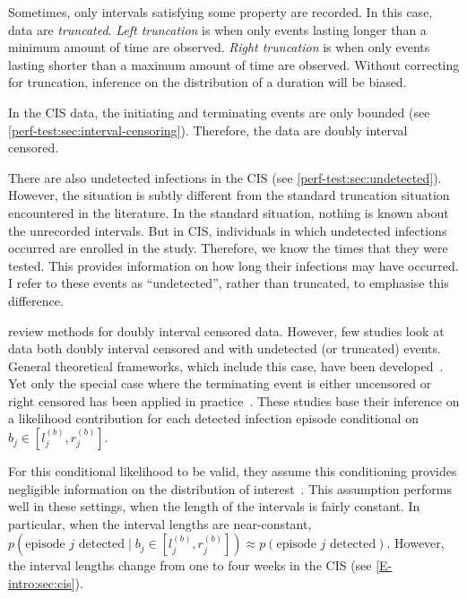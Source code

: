 \documentclass[thesis.tex]{subfiles}
\begin{document}
Sometimes, only intervals satisfying some property are recorded.
In this case, data are \emph{truncated}.
\emph{Left truncation} is when only events lasting longer than a minimum amount of time are observed.
\emph{Right truncation} is when only events lasting shorter than a maximum amount of time are observed.
Without correcting for truncation, inference on the distribution of a duration will be biased.

In the CIS data, the initiating and terminating events are only bounded (see \cref{perf-test:sec:interval-censoring}).
Therefore, the data are doubly interval censored.

There are also undetected infections in the CIS (see \cref{perf-test:sec:undetected}).
However, the situation is subtly different from the standard truncation situation encountered in the literature.
In the standard situation, nothing is known about the unrecorded intervals.
But in CIS, individuals in which undetected infections occurred are enrolled in the study.
Therefore, we know the times that they were tested.
This provides information on how long their infections may have occurred.
I refer to these events as ``undetected'', rather than truncated, to emphasise this difference.

\Textcite{sunAnalysis,bogaertsSurvival} review methods for doubly interval censored data.
However, few studies look at data both doubly interval censored and with undetected (or truncated) events.
General theoretical frameworks, which include this case, have been developed~\autocite{turnbullEmpirical,dempsterMaximum}.
Yet only the special case where the terminating event is either uncensored or right censored has been applied in practice~\autocite[e.g.][]{sunEmpirical,bacchettiNonparametric,shenNonparametric}.
These studies base their inference on a likelihood contribution for each detected infection episode conditional on $b_j \in [l_j^{(b)}, r_j^{(b)}]$.

For this conditional likelihood to be valid, they assume this conditioning provides negligible information on the distribution of interest~.
This assumption performs well in these settings, when the length of the intervals is fairly constant.
In particular, when the interval lengths are near-constant, $p(\text{episode $j$ detected} \mid b_j \in [l_j^{(b)}, r_j^{(b)}]) \approx p(\text{episode $j$ detected})$.
However, the interval lengths change from one to four weeks in the CIS (see \cref{E-intro:sec:cis}).
\end{document}
